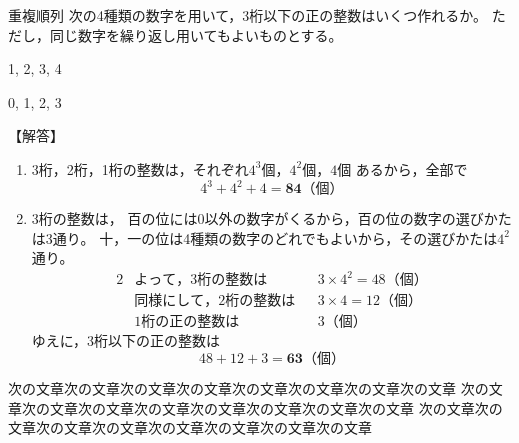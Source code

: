 \documentclass[a4j,fleqn]{jarticle}
\begin{document}
\begin{itembox}{重複順列}
次の4種類の数字を用いて，3桁以下の正の整数はいくつ作れるか。
ただし，同じ数字を繰り返し用いてもよいものとする。
\begin{edaenumerate}[(1)]
  \item 1, 2, 3, 4
  \item 0, 1, 2, 3
\end{edaenumerate}
\end{itembox}

\begin{tyuukai}
\abovedisplayskip=2pt\relax
\belowdisplayskip=2pt\relax
【解答】
\begin{enumerate}[(1)]
  \item 3桁，2桁，1桁の整数は，それぞれ$4^3$個，$4^2$個，$4$個
    あるから，全部で
    \[ 4^3+4^2+4=\bm{84}（個）\]
  \item 3桁の整数は，
    百の位には0以外の数字がくるから，百の位の数字の選びかたは3通り。
    十，一の位は4種類の数字のどれでもよいから，その選びかたは$4^2$通り。
    {\mathindent=0pt\relax
      \begin{alignat*}{2}
        &よって，3桁の整数は \qquad && 3\times4^2=48（個）\\
        &同様にして，2桁の整数は && 3\times4=12（個）\\
        &1桁の正の整数は && 3（個）
      \end{alignat*}
    }%
    ゆえに，3桁以下の正の整数は
    \[ 48+12+3=\bm{63}（個）\]
\end{enumerate}
\end{tyuukai}

次の文章次の文章次の文章次の文章次の文章次の文章次の文章次の文章
次の文章次の文章次の文章次の文章次の文章次の文章次の文章次の文章
次の文章次の文章次の文章次の文章次の文章次の文章次の文章次の文章
\end{document}
